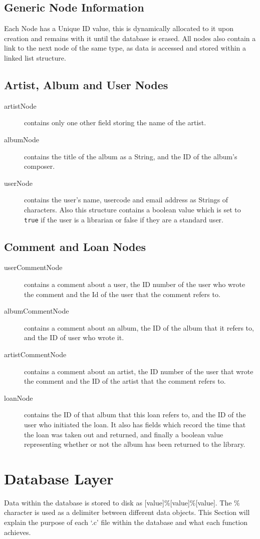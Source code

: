 \documentclass{article}
\begin{document}
\subsection{Generic Node Information}
Each Node has a Unique ID value, this is dynamically allocated to it upon creation and remains with it until the database is erased. All nodes  also contain a link to the next node of the same type, as data is accessed and stored within a linked list structure. 
\subsection{Artist, Album and User Nodes}
\begin{description}
\item[artistNode]  contains only one other field storing the name of the artist.
\item[albumNode] contains the title of the album as a String, and the ID of the album's composer.
\item[userNode] contains the user's name, usercode and email address as Strings of characters. Also this structure contains a boolean value which is set to \verb|true| if the user is a librarian or false if they are a standard user.
\end{description}
\subsection{Comment and Loan Nodes}
\begin{description}
\item[userCommentNode] contains a comment about a user, the ID number of the user who wrote the comment and the Id of the user that the comment refers to.
\item[albumCommentNode] contains a comment about an album, the ID of the album that it refers to, and the ID of user who wrote it.
\item[artistCommentNode] contains a comment about an artist, the ID number of the user that wrote the comment and the ID of the artist that the comment refers to.
\item[loanNode] contains the ID of that album that this loan refers to, and the ID of the user who initiated the loan. It also has fields which record the time that the loan was taken out and returned, and finally a boolean value representing whether or not the album has been returned to the library.
\end{description}


\section{Database Layer}
Data within the database is stored to disk as [value]\%[value]\%[value]. The \% character is used as a delimiter between different data objects. This Section will explain the purpose of each `.c' file within the database and what each function achieves.
\end{document}
